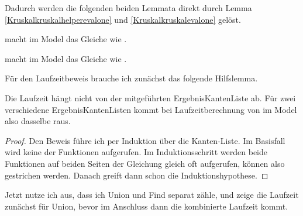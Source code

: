Dadurch werden die folgenden beiden Lemmata direkt durch Lemma \ref{Kruskalkruskalhelperevalone} und \ref{Kruskalkruskalevalone} gelöst.
\begin{lemma}[\Kruskalkruskalhelperevaltwo]
  \Kruskalkruskalhelperprog macht im Model \Kruskalkruskalmodeltwo das Gleiche wie \Kruskalkruskalhelper.
\end{lemma} 
\begin{lemma}[\Kruskalkruskalevaltwo]
  \Kruskalkruskalprog macht im Model \Kruskalkruskalmodeltwo das Gleiche wie \Kruskalkruskal.
\end{lemma}

Für den Laufzeitbeweis brauche ich zunächst das folgende Hilfslemma.

\begin{lemma}[\KruskalkruskalhelpertimetwoindependentedgesSoFar]\label{KruskalkruskalhelpertimetwoindependentedgesSoFar}
  Die Laufzeit hängt nicht von der mitgeführten ErgebnisKantenListe ab.
  Für zwei verschiedene ErgebnisKantenListen kommt bei Laufzeitberechnung von \Kruskalkruskalhelperprog im Model \Kruskalkruskalmodeltwo also dasselbe raus.
\end{lemma}
\begin{proof}
  Den Beweis führe ich per Induktion über die Kanten-Liste.
  Im Basisfall wird keine der Funktionen aufgerufen.
  Im Induktionsschritt werden beide Funktionen auf beiden Seiten der Gleichung gleich oft aufgerufen, können also gestrichen werden.
  Danach greift dann schon die Induktionshypothese.
\end{proof}

Jetzt nutze ich aus, dass ich Union und Find separat zähle, und zeige die Laufzeit zunächst für Union, bevor im Anschluss dann die kombinierte Laufzeit kommt.

